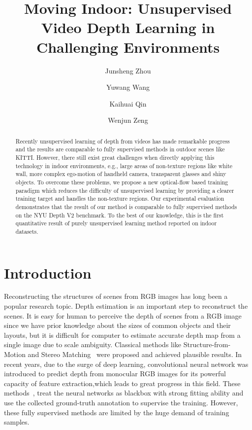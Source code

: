 \documentclass[10pt,twocolumn,letterpaper]{article}
\begin{document}
\title{Moving Indoor: Unsupervised Video Depth Learning in Challenging Environments}

\author[1,\footnote{}]{Junsheng Zhou}
\author[2]{Yuwang Wang}
\author[1]{Kaihuai Qin}
\author[2]{Wenjun Zeng}



\maketitle


\ificcvfinal\thispagestyle{empty}\fi

\begin{abstract}
Recently unsupervised learning of depth from videos has made remarkable progress and the results are comparable to fully supervised methods in outdoor scenes like KITTI. However, there still exist great challenges when directly applying this technology in indoor environments, e.g., large areas of non-texture regions like white wall, more complex ego-motion of handheld camera, transparent glasses and shiny objects. To overcome these problems, we propose a new optical-flow based training paradigm which reduces the difficulty of unsupervised learning by providing a clearer training target and handles the non-texture regions. Our experimental evaluation demonstrates that the result of our method is comparable to fully supervised methods on the NYU Depth V2 benchmark. To the best of our knowledge, this is the first quantitative result of purely unsupervised learning method reported on indoor datasets.
\end{abstract}

\section{Introduction}

Reconstructing the structures of scenes from RGB images has long been a popular research topic. Depth estimation is an important step to reconstruct the scenes. It is easy for human to perceive the depth of scenes from a RGB image since we have prior knowledge about the sizes of common objects and their layouts, but it is difficult for computer to estimate accurate depth map from a single image due to scale ambiguity. Classical methods like Structure-from-Motion and Stereo Matching~\cite{furukawa2015multi,hartley2003multiple} were proposed and achieved plausible results. In recent years, due to the surge of deep learning, convolutional neural network was introduced to predict depth from monocular RGB images for its powerful capacity of feature extraction,which leads to great progress in this field. These methods~\cite{liu2014discrete,eigen2014depth,eigen2015predicting}, treat the neural networks as blackbox with strong fitting ability and use the collected ground-truth annotation to supervise the training. However, these fully supervised methods are limited by the huge demand of training samples. 
\end{document}
